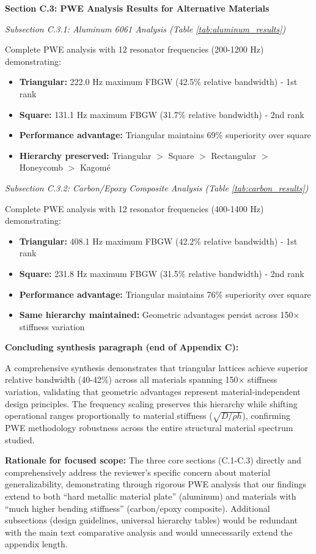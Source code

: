\documentclass[11pt,a4paper]{article}
\newenvironment{changesbox}{%
    \par\medskip\noindent{\color{changescolor}\rule{\linewidth}{2pt}}\par
    \noindent{\color{changescolor}\bfseries Manuscript Changes}\par\smallskip
}{%
    \par\noindent{\color{changescolor}\rule{\linewidth}{0.5pt}}\medskip
}
\begin{document}
\begin{changesbox}
\textbf{Section C.3: PWE Analysis Results for Alternative Materials}

\textit{Subsection C.3.1: Aluminum 6061 Analysis (Table \ref{tab:aluminum_results})}

Complete PWE analysis with 12 resonator frequencies (200-1200 Hz) demonstrating:
\begin{itemize}
    \item \textbf{Triangular:} 222.0 Hz maximum FBGW (42.5\% relative bandwidth) - 1st rank
    \item \textbf{Square:} 131.1 Hz maximum FBGW (31.7\% relative bandwidth) - 2nd rank
    \item \textbf{Performance advantage:} Triangular maintains 69\% superiority over square
    \item \textbf{Hierarchy preserved:} Triangular $>$ Square $>$ Rectangular $>$ Honeycomb $>$ Kagomé
\end{itemize}

\textit{Subsection C.3.2: Carbon/Epoxy Composite Analysis (Table \ref{tab:carbon_results})}

Complete PWE analysis with 12 resonator frequencies (400-1400 Hz) demonstrating:
\begin{itemize}
    \item \textbf{Triangular:} 408.1 Hz maximum FBGW (42.2\% relative bandwidth) - 1st rank
    \item \textbf{Square:} 231.8 Hz maximum FBGW (31.5\% relative bandwidth) - 2nd rank
    \item \textbf{Performance advantage:} Triangular maintains 76\% superiority over square
    \item \textbf{Same hierarchy maintained:} Geometric advantages persist across 150$\times$ stiffness variation
\end{itemize}

\textbf{Concluding synthesis paragraph (end of Appendix C):}

A comprehensive synthesis demonstrates that triangular lattices achieve superior relative bandwidth (40-42\%) across all materials spanning 150$\times$ stiffness variation, validating that geometric advantages represent material-independent design principles. The frequency scaling preserves this hierarchy while shifting operational ranges proportionally to material stiffness ($\sqrt{D/\rho h}$), confirming PWE methodology robustness across the entire structural material spectrum studied.

\textbf{Rationale for focused scope:} The three core sections (C.1-C.3) directly and comprehensively address the reviewer's specific concern about material generalizability, demonstrating through rigorous PWE analysis that our findings extend to both ``hard metallic material plate'' (aluminum) and materials with ``much higher bending stiffness'' (carbon/epoxy composite). Additional subsections (design guidelines, universal hierarchy tables) would be redundant with the main text comparative analysis and would unnecessarily extend the appendix length.


\end{changesbox}
\end{document}
